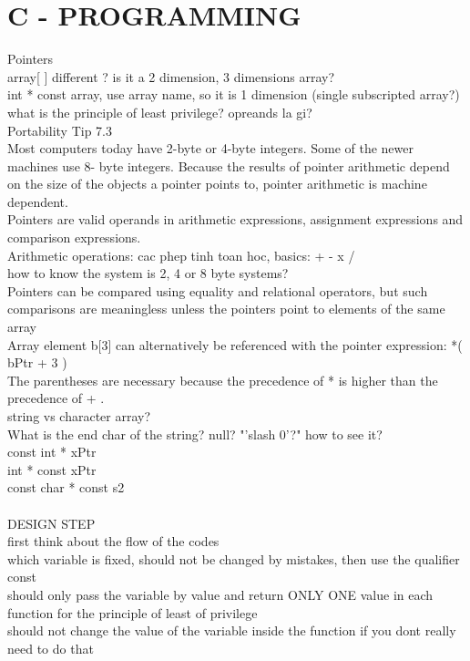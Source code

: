 \documentclass{article}
\begin{document}
\section{C - PROGRAMMING}
Pointers\\
array[ ] different ? is it a 2 dimension, 3 dimensions array?\\
int * const array, use array name, so it is 1 dimension (single subscripted array?)\\
what is the principle of least privilege?
opreands la gi?\\
Portability Tip 7.3\\
Most computers today have 2-byte or 4-byte integers. Some of the newer machines use 8-
byte integers. Because the results of pointer arithmetic depend on the size of the objects a
pointer points to, pointer arithmetic is machine dependent.\\
Pointers are valid operands in arithmetic expressions, assignment expressions and comparison expressions.\\
Arithmetic operations: cac phep tinh toan hoc, basics: + - x / 
\\
how to know the system is 2, 4 or 8 byte systems?
\\
Pointers can be compared using equality and relational operators, but such comparisons are meaningless unless the pointers point to elements of the same array
\\
Array element b[3] can alternatively be referenced with the pointer expression: *( bPtr + 3 )\\
The parentheses are necessary because the precedence of * is higher than the precedence of + .
\\
string vs character array?\\
What is the end char of the string? null? "'slash 0'?" how to see it?\\
const int * xPtr \\
int * const xPtr \\
const char * const s2\\
\\DESIGN STEP
\\first think about the flow of the codes
\\which variable is fixed, should not be changed by mistakes, then use the qualifier const
\\should only pass the variable by value and return ONLY ONE value in each function for the principle of least of privilege
\\should not change the value of the variable inside the function if you dont really need to do that
\end{document}
